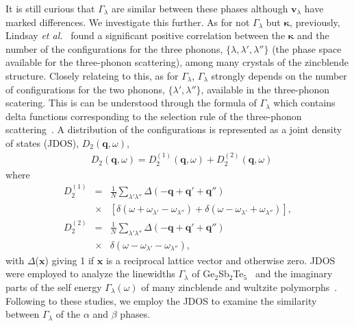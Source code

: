 \documentclass[twocolumn,amsmath,amssymb,a4paper,prb,superscriptaddress,floatfix]{revtex4-1}
\begin{document}
It is still curious that $\Gamma_\lambda$ are similar between these phases
although $\mathbf{v}_\lambda$ have marked differences.  We investigate
this further.
As for not $\Gamma_{\lambda}$ but $\boldsymbol{\kappa}$, previously, Lindsay {\it et
al.}~\cite{Lindsay} found a significant positive correlation between the
$\boldsymbol{\kappa}$ and the number of the configurations for the three
phonons, $\{\lambda, \lambda', \lambda''\}$ (the phase space available for the
three-phonon scattering), among many crystals of the zincblende structure. 
Closely relateing to this, as for $\Gamma_{\lambda}$, $\Gamma_{\lambda}$
strongly depends on the number of configurations for the two phonons,
$\{\lambda', \lambda''\}$, available in the three-phonon scatering. This is
can be understood through the formula of $\Gamma_{\lambda}$ which  contains delta functions corresponding to the
selection rule of the three-phonon scattering~\cite{phono3py}. 
A distribution of the configurations is represented
as a joint density of states (JDOS), ${D_2(\mathbf{q},\omega)}$,  
\begin{align}
 \label{eq:jdos}
 &D_2(\mathbf{q},\omega) = D_2^{(1)}(\mathbf{q},\omega) +  D_2^{(2)}(\mathbf{q},\omega)
\end{align}
where 
\begin{eqnarray*}
	D_2^{(1)} & = & \frac{1}{N} \sum_{\lambda'\lambda''}\Delta(-\mathbf{q} + \mathbf{q'} + \mathbf{q''}) \nonumber \\
								   & \times & [\delta(\omega + \omega_{\lambda'} - \omega_{\lambda''}) + \delta(\omega - \omega_{\lambda'} + \omega_{\lambda''})],\\
	D_2^{(2)} & = & \frac{1}{N} \sum_{\lambda'\lambda''}\Delta(-\mathbf{q} + \mathbf{q'} + \mathbf{q''}) \nonumber \\
								   & \times & \delta(\omega - \omega_{\lambda'} - \omega_{\lambda''}),
\end{eqnarray*}
with $\Delta$($\mathbf{x}$) giving 1 if $\mathbf{x}$ is a reciprocal lattice
vector and otherwise zero.  JDOS were employed to analyze the linewidths
$\Gamma_{\lambda}$ of Ge$_2$Sb$_2$Te$_5$~\cite{mukhopadhyay-ltc} and the
imaginary parts of the self energy $\Gamma_{\lambda}(\omega)$ of many
zincblende and wultzite polymorphs~\cite{phono3py}.  Following to these studies,
we employ the JDOS to examine the similarity between $\Gamma_{\lambda}$ 
of the $\alpha$ and $\beta$ phases.
\end{document}
